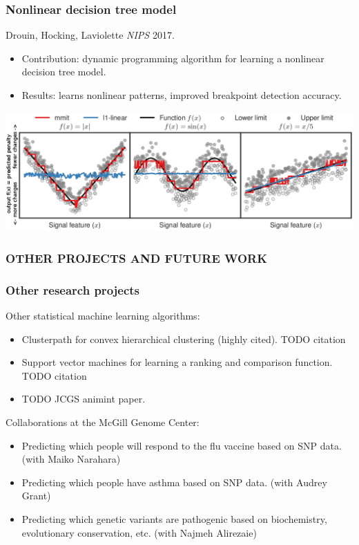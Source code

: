 \documentclass{beamer}
\begin{document}
\begin{frame}
  \frametitle{Nonlinear decision tree model}
  Drouin, Hocking, Laviolette {\it NIPS} 2017.
  \begin{itemize}
  \item Contribution: dynamic programming algorithm for learning a
    nonlinear decision tree model.
  \item Results: learns nonlinear patterns, improved
    breakpoint detection accuracy.
  \end{itemize}

\includegraphics[width=\textwidth]{screenshot-mmit-learned}
\end{frame}

\begin{frame}
  \frametitle{OTHER PROJECTS AND FUTURE WORK}
  
\end{frame}

\begin{frame}
  \frametitle{Other research projects}
  Other statistical machine learning algorithms:
  \begin{itemize}
  \item Clusterpath for convex hierarchical clustering (highly
    cited). TODO citation
  \item Support vector machines for learning a ranking and comparison
    function. TODO citation
  \item TODO JCGS animint paper.
  \end{itemize}
  Collaborations at the McGill Genome Center:
  \begin{itemize}
  \item Predicting which people will respond to the flu vaccine based
    on SNP data. (with Maiko Narahara)
  \item Predicting which people have asthma based on SNP
    data. (with Audrey Grant)
  \item Predicting which genetic variants are pathogenic based on
    biochemistry, evolutionary conservation, etc. (with
    Najmeh Alirezaie)
  \end{itemize}
\end{frame}
\end{document}
